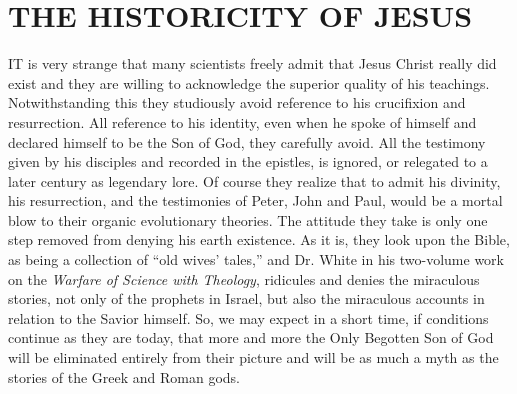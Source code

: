 \chapter{THE HISTORICITY OF JESUS}

IT is very strange that many scientists freely admit that Jesus Christ really did exist and they
are willing to acknowledge the superior quality of his teachings. Notwithstanding this they
studiously avoid reference to his crucifixion and resurrection. All reference to his identity,
even when he spoke of himself and declared himself to be the Son of God, they carefully
avoid. All the testimony given by his disciples and recorded in the epistles, is ignored, or
relegated to a later century as legendary lore. Of course they realize that to admit his divinity,
his resurrection, and the testimonies of Peter, John and Paul, would be a mortal blow to their
organic evolutionary theories. The attitude they take is only one step removed from denying
his earth existence. As it is, they look upon the Bible, as being a collection of ``old wives'
tales,'' and Dr. White in his two-volume work on the \textit{Warfare of Science with Theology},
ridicules and denies the miraculous stories, not only of the prophets in Israel, but also the
miraculous accounts in relation to the Savior himself. So, we may expect in a short time, if
conditions continue as they are today, that more and more the Only Begotten Son of God will
be eliminated entirely from their picture and will be as much a myth as the stories of the
Greek and Roman gods.

